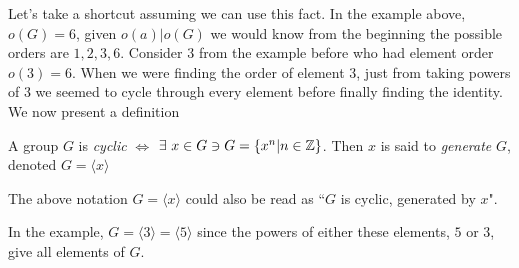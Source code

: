 Let's take a shortcut assuming we can use this fact. In the example above, $o(G)=6$, given
$o(a)|o(G)$ we would know from the beginning the possible orders are $1,2,3,6$. Consider $3$ from
the example before who had element order $o(3)=6$. When we were finding the order of element $3$,
just from taking powers of 3 we seemed to cycle through every element before finally finding the
identity. We now present a definition
\begin{definition}
A group $G$ is \textit{cyclic} $\iff$ $\exists \ x\in G \ni G=\{x^n|n\in {\mathbb{Z}}\}$. Then $x$ is said to
\textit{generate} $G$, denoted $G=\langle x \rangle$
\end{definition}
The above notation $G=\langle x \rangle$ could also be read as ``$G$ is cyclic, generated by $x$".
\steezybreak

\noindent In the example, $G=\langle 3 \rangle=\langle 5 \rangle$ since the powers of either these
elements, $5$ or $3$, give all elements of $G$.

